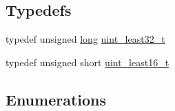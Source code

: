\subsection*{Typedefs}
\begin{DoxyCompactItemize}
\item 
typedef unsigned \hyperlink{ioapi_8h_a3c7b35ad9dab18b8310343c201f7b27e}{long} \hyperlink{namespacegambatte_a0639f09fccfbbd5a8e0796318768e370}{uint\+\_\+least32\+\_\+t}
\item 
typedef unsigned short \hyperlink{namespacegambatte_a96dc34dacb6f21ab43c4a9f371134ec8}{uint\+\_\+least16\+\_\+t}
\end{DoxyCompactItemize}
\subsection*{Enumerations}
